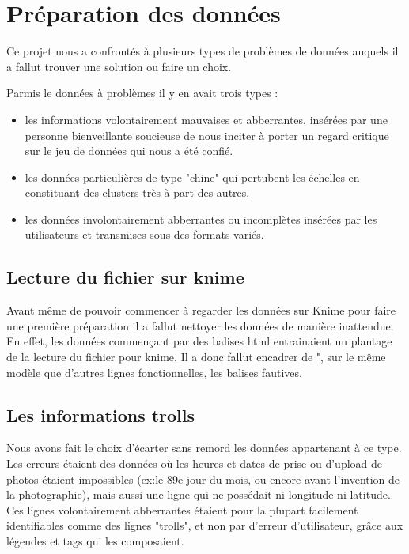 \chapter{Préparation des données}

Ce projet nous a confrontés à plusieurs types de problèmes de données auquels il a fallut trouver une solution ou faire un choix.

Parmis le données à problèmes il y en avait trois types :
\begin{itemize}
    \item les informations volontairement mauvaises et abberrantes, insérées par une personne bienveillante soucieuse de nous inciter à porter un regard critique sur le jeu de données qui nous a été confié.
    \item les données particulières de type "chine" qui pertubent les échelles en constituant des clusters très à part des autres.
    \item les données involontairement abberrantes ou incomplètes insérées par les utilisateurs et transmises sous des formats variés.
\end{itemize}

\section{Lecture du fichier sur knime}
Avant même de pouvoir commencer à regarder les données sur Knime pour faire une première préparation il a fallut nettoyer les données de manière inattendue. En effet, les données commençant par des balises html entrainaient un plantage de la lecture du fichier pour knime. Il a donc fallut encadrer de ", sur le même modèle que d'autres lignes fonctionnelles, les balises fautives.

\section{Les informations trolls}
Nous avons fait le choix d'écarter sans remord les données appartenant à ce type.
Les erreurs étaient des données où les heures et dates de prise ou d'upload de photos étaient impossibles (ex:le 89e jour du mois, ou encore avant l'invention de la photographie), mais aussi une ligne qui ne possédait ni longitude ni latitude.
Ces lignes volontairement abberrantes étaient pour la plupart facilement identifiables comme des lignes "trolls", et non par d'erreur d'utilisateur, grâce aux légendes et tags qui les composaient.

